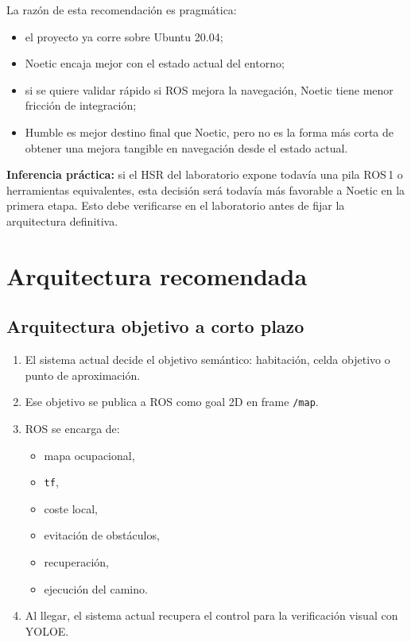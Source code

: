 \documentclass[11pt,a4paper]{article}
\begin{document}
La razón de esta recomendación es pragmática:

\begin{itemize}
  \item el proyecto ya corre sobre Ubuntu 20.04;
  \item Noetic encaja mejor con el estado actual del entorno;
  \item si se quiere validar rápido si ROS mejora la navegación, Noetic tiene
        menor fricción de integración;
  \item Humble es mejor destino final que Noetic, pero no es la forma más corta
        de obtener una mejora tangible en navegación desde el estado actual.
\end{itemize}

\textbf{Inferencia práctica:} si el HSR del laboratorio expone todavía una pila
ROS\,1 o herramientas equivalentes, esta decisión será todavía más favorable a
Noetic en la primera etapa. Esto debe verificarse en el laboratorio antes de
fijar la arquitectura definitiva.

\section{Arquitectura recomendada}

\subsection{Arquitectura objetivo a corto plazo}

\begin{enumerate}
  \item El sistema actual decide el objetivo semántico:
        habitación, celda objetivo o punto de aproximación.
  \item Ese objetivo se publica a ROS como goal 2D en frame \texttt{/map}.
  \item ROS se encarga de:
        \begin{itemize}
          \item mapa ocupacional,
          \item \texttt{tf},
          \item coste local,
          \item evitación de obstáculos,
          \item recuperación,
          \item ejecución del camino.
        \end{itemize}
  \item Al llegar, el sistema actual recupera el control para la verificación
        visual con YOLOE.
\end{enumerate}
\end{document}

